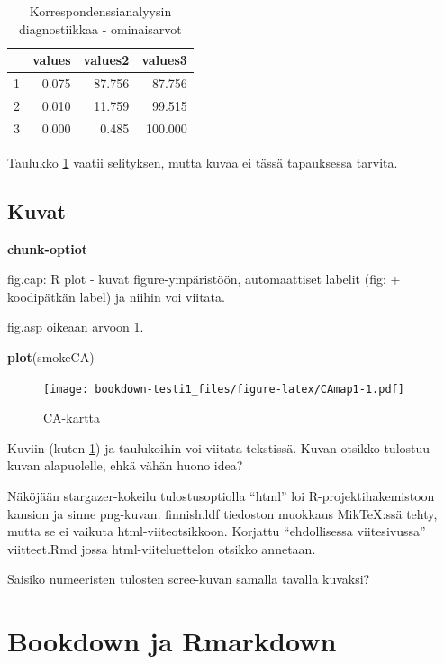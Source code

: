 \documentclass[
  finnish,
]{book}
\newenvironment{Shaded}{\begin{snugshade}}{\end{snugshade}}
\newcommand{\KeywordTok}[1]{\textcolor[rgb]{0.13,0.29,0.53}{\textbf{#1}}}
\newcommand{\NormalTok}[1]{#1}
\begin{document}
\begin{table}

\caption{\label{tab:simpleCAscree}Korrespondenssianalyysin diagnostiikkaa - ominaisarvot}
\centering
\begin{tabular}[t]{rrrr}
\toprule
 & values & values2 & values3\\
\midrule
1 & 0.075 & 87.756 & 87.756\\
2 & 0.010 & 11.759 & 99.515\\
3 & 0.000 & 0.485 & 100.000\\
\bottomrule
\end{tabular}
\end{table}

Taulukko \ref{tab:simpleCAscree} vaatii selityksen, mutta kuvaa ei tässä tapauksessa tarvita.

\hypertarget{kuvat}{%
\section{Kuvat}\label{kuvat}}

\textbf{chunk-optiot}

fig.cap: R plot - kuvat figure-ympäristöön, automaattiset labelit (fig: + koodipätkän label) ja niihin voi viitata.

fig.asp oikeaan arvoon 1.

\begin{Shaded}
\begin{Highlighting}[]
\KeywordTok{plot}\NormalTok{(smokeCA)}
\end{Highlighting}
\end{Shaded}

\begin{figure}
\centering
\texttt{[image: bookdown-testi1\_files/figure-latex/CAmap1-1.pdf]}
\caption{\label{fig:CAmap1}CA-kartta}
\end{figure}

Kuviin (kuten \ref{fig:CAmap1}) ja taulukoihin voi viitata tekstissä. Kuvan otsikko tulostuu kuvan alapuolelle, ehkä vähän huono idea?

Näköjään stargazer-kokeilu tulostusoptiolla ``html'' loi R-projektihakemistoon kansion ja sinne png-kuvan.
finnish.ldf tiedoston muokkaus MikTeX:ssä tehty, mutta se ei vaikuta html-viiteotsikkoon. Korjattu ``ehdollisessa viitesivussa'' viitteet.Rmd jossa html-viiteluettelon otsikko annetaan.

Saisiko numeeristen tulosten scree-kuvan samalla tavalla kuvaksi?

\hypertarget{bookdown-ja-rmarkdown}{%
\chapter{Bookdown ja Rmarkdown}\label{bookdown-ja-rmarkdown}}
\end{document}
